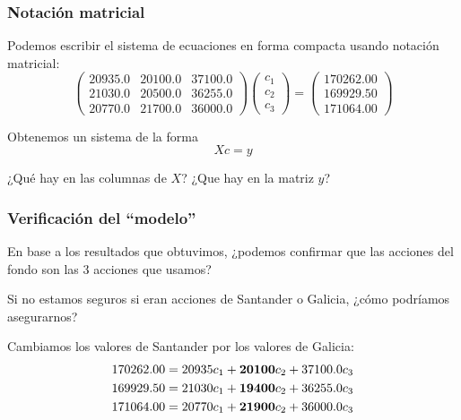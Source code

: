 \documentclass[aspectratio=169,12pt]{beamer}
\begin{document}
\begin{frame}
\frametitle{Notación matricial}

Podemos escribir el sistema de ecuaciones
en forma compacta usando notación matricial:
$$
\begin{pmatrix}
20935.0	& 20100.0 & 37100.0 \\
21030.0	& 20500.0 & 36255.0 \\
20770.0	& 21700.0 & 36000.0
\end{pmatrix}
\begin{pmatrix}
c_1 \\
c_2 \\
c_3
\end{pmatrix} =
\begin{pmatrix}
170262.00 \\
169929.50 \\
171064.00
\end{pmatrix}
$$

Obtenemos un sistema de la forma
$$
X c = y
$$

¿Qué hay en las columnas de $X$? ¿Que hay en la matriz $y$?



\end{frame}


\begin{frame}
\frametitle{Verificación del ``modelo''}

En base a los resultados que obtuvimos, ¿podemos confirmar que las acciones del fondo son las 3 acciones que usamos?

Si no estamos seguros si eran acciones de Santander o Galicia, ¿cómo podríamos asegurarnos?

Cambiamos los valores de Santander por los valores de Galicia:
\begin{align*}
170262.00	&= 20935	c_1 + {\bf 20100} c_2 + 37100.0 c_3 \\
169929.50	&= 21030	c_1 + {\bf 19400} c_2 + 36255.0 c_3 \\
171064.00	&= 20770	c_1 + {\bf 21900} c_2 + 36000.0 c_3
\end{align*}


\end{frame}


\end{document}
